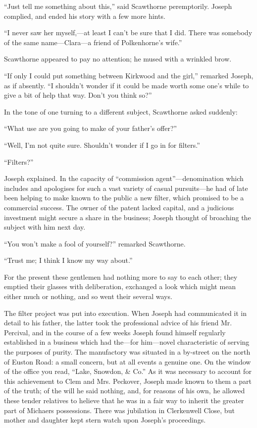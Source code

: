 ``Just tell me something about this,'' said Scawthorne peremptorily.
Joseph complied, and ended his story with a few more hints.

{}``I never saw her myself,---at least I can't be sure that I did. There
was somebody of the same name---Clara---a friend of Polkenhorne's
wife.''

Scawthorne appeared to pay no attention; he mused with a wrinkled brow.

``If only I could put something between Kirkwood and the girl,''
remarked Joseph, as if absently. ``I shouldn't wonder if it could be
made worth some one's while to give a bit of help that way. Don't you
think so?''

In the tone of one turning to a different subject, Scawthorne asked
suddenly:

``What use are you going to make of your father's offer?''

``Well, I'm not quite sure. Shouldn't wonder if I go in for filters.''

``Filters?''

Joseph explained. In the capacity of ``commission agent''---denomination
which includes and apologises for such a vast variety of casual
pursuits---he had of late been helping to make known to the public a new
filter, which promised to be a commercial success. {}The owner of the
patent lacked capital, and a judicious investment might secure a share
in the business; Joseph thought of broaching the subject with him next
day.

``You won't make a fool of yourself?'' remarked Scawthorne.

``Trust me; I think I know my way about.''

For the present these gentlemen had nothing more to say to each other;
they emptied their glasses with deliberation, exchanged a look which
might mean either much or nothing, and so went their several ways.

The filter project was put into execution. When Joseph had communicated
it in detail to his father, the latter took the professional advice of
his friend Mr. Percival, and in the course of a few weeks Joseph found
himself regularly established in a business which had the---for
him---novel characteristic of serving the purposes of purity. The
manufactory was situated in a by-street on the north of Euston Road: a
small concern, but at all events a genuine one. On the window of the
office you read, ``Lake, Snowdon, \& Co.'' As it was necessary to
account for this {}achievement to Clem and Mrs. Peckover, Joseph made
known to them a part of the truth; of the will he said nothing, and, for
reasons of his own, he allowed these tender relatives to helieve that he
was in a fair way to inherit the greater part of Michaers possessions.
There was jubilation in Clerkenwell Close, but mother and daughter kept
stern watch upon Joseph's proceedings.

